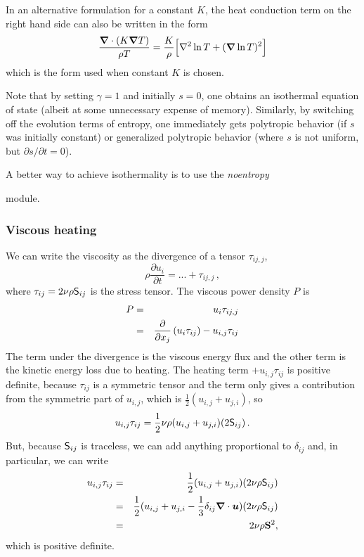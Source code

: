 \documentclass[\mydriver,12pt,twoside,notitlepage,a4paper]{article}
\makeatletter
\newcommand{\name}[2][]{%
  \def\index@{#1}%
  \textsl{#2\/}%
  \ifx\index@\@empty\index{#2@\MakeUppercase #2}%
  \else\index{#1}%
  \fi%
}
\renewcommand{\vec}[1]{\mbox{\boldmath{$#1$}}}
\newcommand{\grad}    {\vec{\nabla}}
\newcommand{\Div}     {\vec{\nabla}\cdot}
\newcommand{\Laplace} {\nabla^2}
\newcommand{\nab}{\mbox{\boldmath $\nabla$} {}}
\makeatother
\begin{document}
In an alternative formulation for a constant $K$, the heat conduction
term on the right hand side can also be written in the form
\begin{eqnarray}
\frac{\Div(K\grad T)}
              {\rho T} =
  \frac{K}{\rho}\Bigl[ \Laplace\ln T + (\grad \ln T)^2 \Bigr]
\end{eqnarray}
which is the form used when constant $K$ is chosen.
\bigskip

Note that by setting $\gamma=1$ and initially $s=0$, one obtains an
isothermal equation of state (albeit at some unnecessary expense of
memory).
Similarly, by switching off the evolution terms of entropy, one immediately
gets polytropic behavior (if $s$ was initially constant) or generalized
polytropic behavior
(where $s$ is not uniform, but $\partial s/\partial t = 0$).

A better way to achieve isothermality is to use the \name{noentropy}
module.

\subsubsection{Viscous heating}

We can write the viscosity as the divergence of a tensor $\tau_{ij,j}$,
\begin{equation}
  \rho \frac{\partial u_i}{\partial t} = ...+\tau_{ij,j} \, ,
\end{equation}
where $\tau_{ij}=2\nu\rho{\sf S}_{ij}$ is the stress tensor. The viscous power
density $P$ is
\begin{eqnarray}
  P &=& u_i\tau_{ij,j}\\
    &=& {\partial\over\partial x_j}\left(u_i\tau_{ij}\right) - u_{i,j}\tau_{ij}
\end{eqnarray}
The term under the divergence is the viscous energy flux and the other
term is the kinetic energy loss due to heating.
The heating term $+u_{i,j}\tau_{ij}$ is positive definite, because $\tau_{ij}$ is a symmetric tensor
and the term only gives a contribution from the symmetric part of $u_{i,j}$,    which
is $\frac{1}{2}(u_{i,j}+u_{j,i})$, so
\begin{equation}
  u_{i,j}\tau_{ij}=\frac{1}{2}\nu\rho(u_{i,j}+u_{j,i})(2{\sf S}_{ij}) \, .
\end{equation}
But, because ${\sf S}_{ij}$ is traceless, we can add anything
proportional to $\delta_{ij}$ and, in particular, we can write
\begin{eqnarray}
u_{i,j}\tau_{ij}&=&\frac{1}{2}(u_{i,j}+u_{j,i})(2\nu\rho{\sf S}_{ij})\\
&=&\frac{1}{2}(u_{i,j}+u_{j,i}-\frac{1}{3}\delta_{ij}\nab\cdot\vec{u})(2\nu\rho{\sf         S}_{ij})\\
&=&2\nu\rho\mathbf{S}^2,
\end{eqnarray}
which is positive definite.
\end{document}
